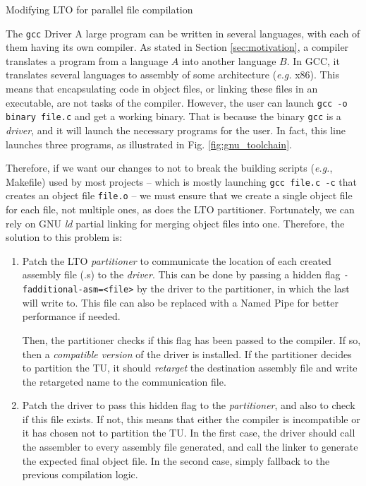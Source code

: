 \begin{section}{Modifying LTO for parallel file compilation}
\begin{subsection}{The \texttt{gcc} Driver}
A large program can be written in several languages, with each of them having
its own compiler. As stated in Section \ref{sec:motivation}, a compiler
translates a program from a language $A$ into another language $B$.
In GCC, it translates several languages to assembly
of some architecture (\textit{e.g.} x86). This means that
encapsulating code in object files, or linking these files in an executable, are
not tasks of the compiler. However, the user can launch \texttt{gcc -o binary
file.c} and get a working binary. That is because the binary \texttt{gcc} is
a \textit{driver}, and it will launch the
necessary programs for the user. In fact, this line launches three programs,
as illustrated in Fig. \ref{fig:gnu_toolchain}.

Therefore, if we want our changes to not to break the building scripts
(\textit{e.g.}, Makefile) used by most projects -- which is mostly launching
\texttt{gcc file.c -c} that creates an object file \texttt{file.o} -- we must
ensure that we create a single object file for each file, not multiple ones, as does
the LTO partitioner. Fortunately, we can rely on GNU \textit{ld} partial linking
for merging object files into one. Therefore, the solution to this problem is:
\begin{enumerate}
	\item Patch the LTO \textit{partitioner} to communicate the location of
	each created assembly file (.s) to the \textit{driver}. This can be
	done by passing a hidden flag \texttt{-fadditional-asm=<file>}
	by the driver to the partitioner, in which the last will write to. This file can also
	be replaced with a Named Pipe for better performance if needed.

	Then, the partitioner checks if this flag has been passed to the compiler.
	If so, then a \textit{compatible version} of the driver is installed. If
	the partitioner decides to partition the TU, it should \textit{retarget}
	the destination assembly file and write the retargeted name to the
	communication file.

	\item Patch the driver to pass this hidden flag to the
	\textit{partitioner}, and also to check if this file exists. If not, this means
	that either the compiler is incompatible or it has chosen not to partition
	the TU. In the first case, the driver should call the assembler to every
	assembly file generated, and call the linker to generate the expected
	final object file. In the second case, simply fallback to the previous
	compilation logic.
\end{enumerate}


\end{subsection}
\end{section}
